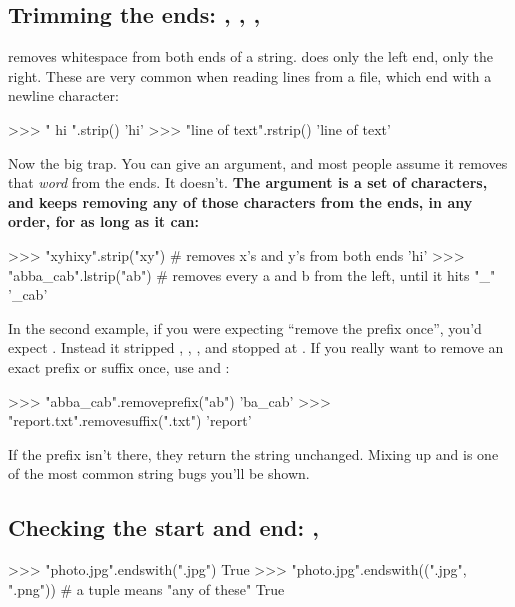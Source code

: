 \documentclass[10pt,a4paper]{article}
\begin{document}
\subsection{Trimming the ends: , , , }
 removes whitespace from both ends of a string.  does only the left end,  only the right. These are very common when reading lines from a file, which end with a newline character:
\begin{txtcode}
>>> "  hi \n".strip()
'hi'
>>> "line of text\n".rstrip()
'line of text'
\end{txtcode}
Now the big trap. You can give  an argument, and most people assume it removes that \emph{word} from the ends. It doesn’t. \textbf{The argument is a set of characters, and  keeps removing any of those characters from the ends, in any order, for as long as it can:}
\begin{txtcode}
>>> "xyhixy".strip("xy")      # removes x's and y's from both ends
'hi'
>>> "abba_cab".lstrip("ab")   # removes every a and b from the left, until it hits "_"
'_cab'
\end{txtcode}
In the second example, if you were expecting “remove the prefix  once”, you’d expect . Instead it stripped , , ,  and stopped at \code{\_}.
If you really want to remove an exact prefix or suffix once, use  and :
\begin{txtcode}
>>> "abba_cab".removeprefix("ab")
'ba_cab'
>>> "report.txt".removesuffix(".txt")
'report'
\end{txtcode}
If the prefix isn’t there, they return the string unchanged. Mixing up  and  is one of the most common string bugs you’ll be shown.
\subsection{Checking the start and end: , }
\begin{txtcode}
>>> "photo.jpg".endswith(".jpg")
True
>>> "photo.jpg".endswith((".jpg", ".png"))    # a tuple means "any of these"
True
\end{txtcode}
\end{document}
